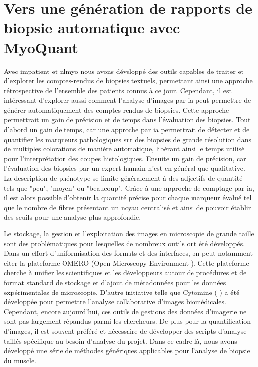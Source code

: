 \chapter{Vers une génération de rapports de biopsie automatique avec MyoQuant}
Avec \gls{impatient} et \gls{nlmyo} nous avons développé des outils capables de traiter et d'explorer les comptes-rendus de biopsies textuels, permettant ainsi une approche rétrospective de l'ensemble des patients connus à ce jour. Cependant, il est intéressant d'explorer aussi comment l'analyse d'images par \gls{ia} peut permettre de générer automatiquement des comptes-rendus de biopsies. Cette approche permettrait un gain de précision et de temps dans l'évaluation des biopsies. Tout d'abord un gain de temps, car une approche par \gls{ia} permettrait de détecter et de quantifier les marqueurs pathologiques sur des biopsies de grande résolution dans de multiples colorations de manière automatique, libérant ainsi le temps utilisé pour l'interprétation des coupes histologiques. Ensuite un gain de précision, car l'évaluation des biopsies par un expert humain n'est en général que qualitative. La description de phénotype se limite généralement à des adjectifs de quantité tels que "peu", "moyen" ou "beaucoup". Grâce à une approche de comptage par \gls{ia}, il est alors possible d'obtenir la quantité précise pour chaque marqueur évalué tel que le nombre de fibres présentant un noyau centralisé et ainsi de pouvoir établir des seuils pour une analyse plus approfondie.


Le stockage, la gestion et l'exploitation des images en microscopie de grande taille sont des problématiques pour lesquelles de nombreux outils ont été développés. Dans un effort d'uniformisation des formats et des interfaces, on peut notamment citer la plateforme OMERO (Open Microscopy Environment \cite{allan_omero_2012}). Cette plateforme cherche à unifier les scientifiques et les développeurs autour de procédures et de format standard de stockage et d'ajout de métadonnées pour les données expérimentales de microscopie. D'autre initiative telle que Cytomine (\cite{maree_collaborative_2016} ) a été développée pour permettre l'analyse collaborative d'images biomédicales. Cependant, encore aujourd'hui, ces outils de gestions des données d'imagerie ne sont pas largement répandus parmi les chercheurs. De plus pour la quantification d'images, il est souvent préféré et nécessaire de développer des scripts d'analyse taillés spécifique au besoin d'analyse du projet. Dans ce cadre-là, nous avons développé une série de méthodes génériques applicables pour l'analyse de biopsie du muscle.

